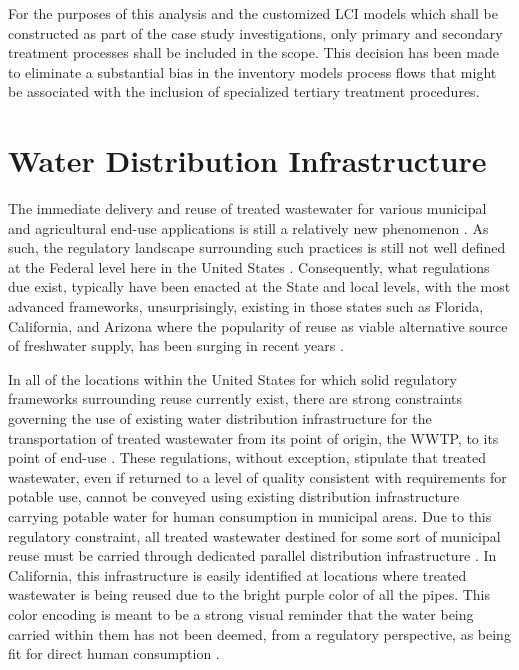 For the purposes of this analysis and the customized LCI models which shall be constructed as part of the case study investigations, only primary and secondary treatment processes shall be included in the scope. This decision has been made to eliminate a substantial bias in the inventory models process flows that might be associated with the inclusion of specialized tertiary treatment procedures.  

\section{Water Distribution Infrastructure}

The immediate delivery and reuse of treated wastewater for various municipal and agricultural end-use applications is still a relatively new phenomenon \cite{Association2011, Bixio2008}. As such, the regulatory landscape surrounding such practices is still not well defined at the Federal level here in the United States \cite{Asano2007}. Consequently, what regulations due exist, typically have been enacted at the State and local levels, with the most advanced frameworks, unsurprisingly, existing in those states such as Florida, California, and Arizona where the popularity of reuse as viable alternative source of freshwater supply, has been surging in recent years \cite{CDWR2003,Rodrigo2012,Younos2014}.

In all of the locations within the United States for which solid regulatory frameworks surrounding reuse currently exist, there are strong constraints governing the use of existing water distribution infrastructure for the transportation of treated wastewater from its point of origin, the WWTP, to its point of end-use \cite{Daughton2004,WorldHealthOrganization2006,CDHS2011}. These regulations, without exception, stipulate that treated wastewater, even if returned to a level of quality consistent with requirements for potable use, cannot be conveyed using existing distribution infrastructure carrying potable water for human consumption in municipal areas. Due to this regulatory constraint, all treated wastewater destined for some sort of municipal reuse must be carried through dedicated parallel distribution infrastructure \cite{CDWR2003}. In California, this infrastructure is easily identified at locations where treated wastewater is being reused due to the bright purple color of all the pipes. This color encoding is meant to be a strong visual reminder that the water being carried within them has not been deemed, from a regulatory perspective, as being fit for direct human consumption \cite{CDHS2001,USEPA2012}. 

